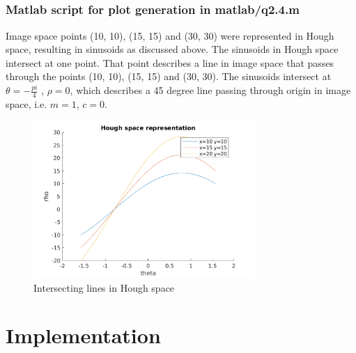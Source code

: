 \documentclass[12pt]{article}
\begin{document}
\subsection{}
\subsubsection{Matlab script for plot generation in matlab/q2.4.m}
Image space points (10, 10), (15, 15) and (30, 30) were represented in Hough space, resulting in sinusoids as discussed above. The sinusoids in Hough space intersect at one point. That point describes a line in image space that passes through the points (10, 10), (15, 15) and (30, 30). The sinusoids intersect at $\theta = - \frac{pi}{4}$ , $\rho = 0$, which describes a 45 degree line passing through origin in image space, i.e. $m=1$, $c=0$.



\begin{figure}[H]
\centering
\includegraphics[page=1,width=0.75\textwidth]{q2_4}
\caption{Intersecting lines in Hough space}    
\label{fig:bblr}
\end{figure}   

\section{Implementation}

\subsection{}
\subsection{}
\subsection{}
\end{document}
